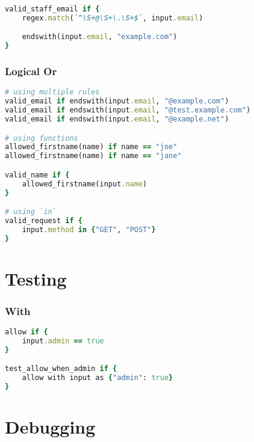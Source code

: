 \documentclass[twocolumn]{article}
\begin{document}
\begin{lstlisting}[language=Ruby]
valid_staff_email if {
	regex.match(`^\S+@\S+\.\S+$`, input.email)

	endswith(input.email, "example.com")
}
\end{lstlisting}





\vspace{-1em}
\subsubsection*{Logical Or}

\begin{lstlisting}[language=Ruby]
# using multiple rules
valid_email if endswith(input.email, "@example.com")
valid_email if endswith(input.email, "@test.example.com")
valid_email if endswith(input.email, "@example.net")

# using functions
allowed_firstname(name) if name == "joe"
allowed_firstname(name) if name == "jane"

valid_name if {
	allowed_firstname(input.name)
}

# using `in`
valid_request if {
	input.method in {"GET", "POST"}
}
\end{lstlisting}









\section*{Testing}




\vspace{-1em}
\subsubsection*{With}

\begin{lstlisting}[language=Ruby]
allow if {
	input.admin == true
}

test_allow_when_admin if {
	allow with input as {"admin": true}
}
\end{lstlisting}









\section*{Debugging}
\end{document}

